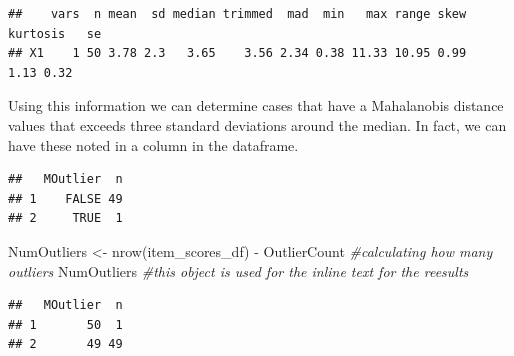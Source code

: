 \documentclass[
]{book}
\newenvironment{Shaded}{\begin{snugshade}}{\end{snugshade}}
\newcommand{\CommentTok}[1]{\textcolor[rgb]{0.56,0.35,0.01}{\textit{#1}}}
\newcommand{\ConstantTok}[1]{\textcolor[rgb]{0.00,0.00,0.00}{#1}}
\newcommand{\DecValTok}[1]{\textcolor[rgb]{0.00,0.00,0.81}{#1}}
\newcommand{\FunctionTok}[1]{\textcolor[rgb]{0.00,0.00,0.00}{#1}}
\newcommand{\NormalTok}[1]{#1}
\newcommand{\OtherTok}[1]{\textcolor[rgb]{0.56,0.35,0.01}{#1}}
\newcommand{\SpecialCharTok}[1]{\textcolor[rgb]{0.00,0.00,0.00}{#1}}
\begin{document}
\begin{verbatim}
##    vars  n mean  sd median trimmed  mad  min   max range skew kurtosis   se
## X1    1 50 3.78 2.3   3.65    3.56 2.34 0.38 11.33 10.95 0.99     1.13 0.32
\end{verbatim}

Using this information we can determine cases that have a Mahalanobis distance values that exceeds three standard deviations around the median. In fact, we can have these noted in a column in the dataframe.

\begin{Shaded}
\end{Shaded}

\begin{verbatim}
##   MOutlier  n
## 1    FALSE 49
## 2     TRUE  1
\end{verbatim}

\begin{Shaded}
\begin{Highlighting}[]
\NormalTok{NumOutliers }\OtherTok{\textless{}{-}} \FunctionTok{nrow}\NormalTok{(item\_scores\_df) }\SpecialCharTok{{-}}\NormalTok{ OutlierCount }\CommentTok{\#calculating how many outliers}
\NormalTok{NumOutliers }\CommentTok{\#this object is used for the inline text for the reesults}
\end{Highlighting}
\end{Shaded}

\begin{verbatim}
##   MOutlier  n
## 1       50  1
## 2       49 49
\end{verbatim}
\end{document}
